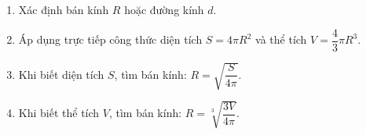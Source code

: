 \begin{enumerate}
\item Xác định bán kính $R$ hoặc đường kính $d$.
\item Áp dụng trực tiếp công thức diện tích $S = 4\pi R^2$ và thể tích $V = \dfrac{4}{3}\pi R^3$.
\item Khi biết diện tích $S$, tìm bán kính: $\boxed{R = \sqrt{\dfrac{S}{4\pi}}}$.
\item Khi biết thể tích $V$, tìm bán kính: $\boxed{R = \sqrt[3]{\dfrac{3V}{4\pi}}}$.
\end{enumerate}
